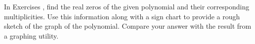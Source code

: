{\noindent In Exercises}
{, find the real zeros of the given polynomial and their corresponding multiplicities.  Use this information along with a sign chart to provide a rough sketch of the graph of the polynomial.  Compare your answer with the result from a graphing utility. \label{polygraphexercise}}
